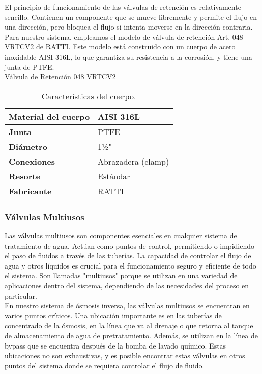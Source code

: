 El principio de funcionamiento de las válvulas de retención es relativamente sencillo. Contienen un componente que se mueve libremente y permite el flujo en una dirección, pero bloquea el flujo si intenta moverse en la dirección contraria.\\

Para nuestro sistema, empleamos el modelo de válvula de retención Art. 048 VRTCV2 de RATTI. Este modelo está construido con un cuerpo de acero inoxidable AISI 316L, lo que garantiza su resistencia a la corrosión, y tiene una junta de PTFE.\\

Válvula de Retención 048 VRTCV2\\

\begin{table}[H]
    \centering
    \caption{Características del cuerpo.}
    \label{table:cuerpo}
    \begin{tabular}{| L{6cm} | L{6cm} |}
        \hline
        \textbf{Material del cuerpo} & AISI 316L \\
        \hline
        \textbf{Junta} & PTFE \\
        \hline
        \textbf{Diámetro} & 1½" \\
        \hline
        \textbf{Conexiones} & Abrazadera (clamp) \\
        \hline
        \textbf{Resorte} & Estándar \\
        \hline
        \textbf{Fabricante} & RATTI \\
        \hline
    \end{tabular}
\end{table}


\subsubsection{Válvulas Multiusos} \label{sec:valvula_multi}

Las válvulas multiusos son componentes esenciales en cualquier sistema de tratamiento de agua. Actúan como puntos de control, permitiendo o impidiendo el paso de fluidos a través de las tuberías. La capacidad de controlar el flujo de agua y otros líquidos es crucial para el funcionamiento seguro y eficiente de todo el sistema. Son llamadas "multiusos" porque se utilizan en una variedad de aplicaciones dentro del sistema, dependiendo de las necesidades del proceso en particular.\\

En nuestro sistema de ósmosis inversa, las válvulas multiusos se encuentran en varios puntos críticos. Una ubicación importante es en las tuberías de concentrado de la ósmosis, en la línea que va al drenaje o que retorna al tanque de almacenamiento de agua de pretratamiento. Además, se utilizan en la línea de bypass que se encuentra después de la bomba de lavado químico. Estas ubicaciones no son exhaustivas, y es posible encontrar estas válvulas en otros puntos del sistema donde se requiera controlar el flujo de fluido.\\

